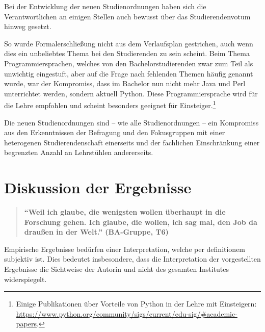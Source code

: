 \documentclass[a4paper,
fontsize=11pt,
oneside,
numbers=noperiodatend,
parskip=half-,
bibliography=totoc,
final
]{scrartcl}
\begin{document}
Bei der Entwicklung der neuen Studienordnungen haben sich die
Verantwortlichen an einigen Stellen auch bewusst über das
Studierendenvotum hinweg gesetzt.

So wurde Formalerschließung nicht aus dem Verlaufsplan gestrichen, auch
wenn dies ein unbeliebtes Thema bei den Studierenden zu sein scheint.
Beim Thema Programmiersprachen, welches von den Bachelorstudierenden
zwar zum Teil als unwichtig eingestuft, aber auf die Frage nach
fehlenden Themen häufig genannt wurde, war der Kompromiss, dass im
Bachelor nun nicht mehr Java und Perl unterrichtet werden, sondern
aktuell Python. Diese Programmiersprache wird für die Lehre empfohlen
und scheint besonders geeignet für Einsteiger.\footnote{Einige
  Publikationen über Vorteile von Python in der Lehre mit Einsteigern:
  \url{https://www.python.org/community/sigs/current/edu-sig/\#academic-papers}.}

Die neuen Studienordnungen sind -- wie alle Studienordnungen -- ein
Kompromiss aus den Erkenntnissen der Befragung und den Fokusgruppen mit
einer heterogenen Studierendenschaft einerseits und der fachlichen
Einschränkung einer begrenzten Anzahl an Lehrstühlen andererseits.

\hypertarget{diskussion-der-ergebnisse}{%
\section{Diskussion der
Ergebnisse}\label{diskussion-der-ergebnisse}}

\begin{quote}
\textbf{\enquote{Weil ich glaube, die wenigsten wollen überhaupt in die
Forschung gehen. Ich glaube, die wollen, ich sag mal, den Job da draußen
in der Welt.} (BA-Gruppe, T6)}
\end{quote}

Empirische Ergebnisse bedürfen einer Interpretation, welche per
definitionem subjektiv ist. Dies bedeutet insbesondere, dass die
Interpretation der vorgestellten Ergebnisse die Sichtweise der Autorin
und nicht des gesamten Institutes widerspiegelt.
\end{document}
